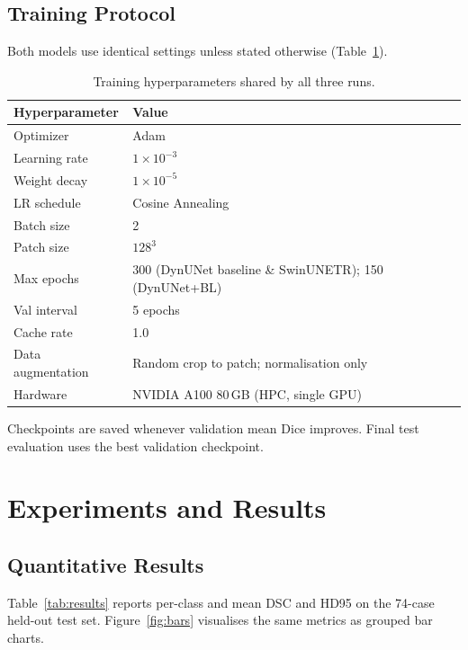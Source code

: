 \documentclass[12pt, letterpaper]{article}
\begin{document}
\subsection{Training Protocol}
Both models use identical settings unless stated otherwise (Table~\ref{tab:training}).

\begin{table}[H]
\centering
\caption{Training hyperparameters shared by all three runs.}
\label{tab:training}
\begin{tabular}{ll}
\toprule
\textbf{Hyperparameter} & \textbf{Value} \\
\midrule
Optimizer           & Adam \\
Learning rate       & $1\times10^{-3}$ \\
Weight decay        & $1\times10^{-5}$ \\
LR schedule         & Cosine Annealing \\
Batch size          & 2 \\
Patch size          & $128^3$ \\
Max epochs          & 300 (DynUNet baseline \& SwinUNETR); 150 (DynUNet+BL) \\
Val interval        & 5 epochs \\
Cache rate          & 1.0 \\
Data augmentation   & Random crop to patch; normalisation only \\
Hardware            & NVIDIA A100 80\,GB (HPC, single GPU) \\
\bottomrule
\end{tabular}
\end{table}

Checkpoints are saved whenever validation mean Dice improves.
Final test evaluation uses the best validation checkpoint.

\section{Experiments and Results}

\subsection{Quantitative Results}

Table~\ref{tab:results} reports per-class and mean DSC and HD95 on the
74-case held-out test set.
Figure~\ref{fig:bars} visualises the same metrics as grouped bar charts.
\end{document}
